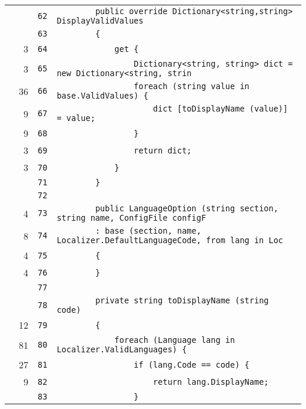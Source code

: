 \documentclass[a4paper,10pt]{article}
\begin{document}
\begin{longtable}[l]{lrrl}
\cellcolor{gray} &  & \verb~62~ & \verb~        public override Dictionary<string,string> DisplayValidValues~\\
\cellcolor{gray} &  & \verb~63~ & \verb~        {~\\
\cellcolor{green} & 3 & \verb~64~ & \verb~            get {~\\
\cellcolor{green} & 3 & \verb~65~ & \verb~                Dictionary<string, string> dict = new Dictionary<string, strin~\\
\cellcolor{green} & 36 & \verb~66~ & \verb~                foreach (string value in base.ValidValues) {~\\
\cellcolor{green} & 9 & \verb~67~ & \verb~                    dict [toDisplayName (value)] = value;~\\
\cellcolor{green} & 9 & \verb~68~ & \verb~                }~\\
\cellcolor{green} & 3 & \verb~69~ & \verb~                return dict;~\\
\cellcolor{green} & 3 & \verb~70~ & \verb~            }~\\
\cellcolor{gray} &  & \verb~71~ & \verb~        }~\\
\cellcolor{gray} &  & \verb~72~ & \verb~~\\
\cellcolor{green} & 4 & \verb~73~ & \verb~        public LanguageOption (string section, string name, ConfigFile configF~\\
\cellcolor{green} & 8 & \verb~74~ & \verb~        : base (section, name, Localizer.DefaultLanguageCode, from lang in Loc~\\
\cellcolor{green} & 4 & \verb~75~ & \verb~        {~\\
\cellcolor{green} & 4 & \verb~76~ & \verb~        }~\\
\cellcolor{gray} &  & \verb~77~ & \verb~~\\
\cellcolor{gray} &  & \verb~78~ & \verb~        private string toDisplayName (string code)~\\
\cellcolor{green} & 12 & \verb~79~ & \verb~        {~\\
\cellcolor{green} & 81 & \verb~80~ & \verb~            foreach (Language lang in Localizer.ValidLanguages) {~\\
\cellcolor{green} & 27 & \verb~81~ & \verb~                if (lang.Code == code) {~\\
\cellcolor{green} & 9 & \verb~82~ & \verb~                    return lang.DisplayName;~\\
\cellcolor{gray} &  & \verb~83~ & \verb~                }~\\

\end{longtable}
\end{document}
